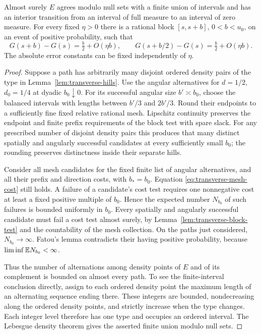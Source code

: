 \begin{lemma}
\label{lem:transverse-finite-jumps}
Almost surely $E$ agrees modulo null sets with a finite union of
intervals and has an interior transition from an interval of full
measure to an interval of zero measure.  For every fixed $\eta>0$
there is a rational block $[s,s+b]$, $0<b<u_0$, on an event of
positive probability, such that
\begin{equation}\label{eq:transverse-jump-block}
 G(s+b)-G(s)=\tfrac b2+O(\eta b),\qquad
 G(s+b/2)-G(s)=\tfrac b2+O(\eta b).
\end{equation}
The absolute error constants can be fixed independently of $\eta$.
\end{lemma}

\begin{proof}
Suppose a path has arbitrarily many disjoint ordered density pairs
of the type in Lemma~\ref{lem:transverse-hills}.  Use the angular
alternatives for $d=1/2$, $d_0=1/4$ at dyadic $b_0\downarrow0$.
For its successful angular size $b'\asymp b_0$, choose the balanced
intervals with lengths between $b'/3$ and $2b'/3$.  Round their
endpoints to a sufficiently fine fixed relative rational mesh.
Lipschitz continuity preserves the endpoint and finite prefix
requirements of the block test with spare slack.  For any prescribed
number of disjoint density pairs this produces that many distinct
spatially and angularly successful candidates at every sufficiently
small $b_0$; the rounding preserves distinctness inside their
separate hills.

Consider all mesh candidates for the fixed finite list of angular
alternatives, and all their prefix and direction costs, with
$b_*=b_0$.  Equation \eqref{eq:transverse-mesh-cost} still holds.
A failure of a candidate's cost test requires one nonnegative cost
at least a fixed positive multiple of $b_0$.  Hence the expected
number $N_{b_0}$ of such failures is bounded uniformly in $b_0$.
Every spatially and angularly successful candidate must fail a cost
test almost surely, by Lemma~\ref{lem:transverse-block-test} and
the countability of the mesh collection.  On the paths just
considered, $N_{b_0}\to\infty$.  Fatou's lemma contradicts their
having positive probability, because $\liminf\mathbb E N_{b_0}<\infty$.

Thus the number of alternations among density points of $E$ and
of its complement is bounded on almost every path.  To see the
finite-interval conclusion directly, assign to each ordered density
point the maximum length of an alternating sequence ending there.
These integers are bounded, nondecreasing along the ordered density
points, and strictly increase when the type changes.  Each integer
level therefore has one type and occupies an ordered interval.
The Lebesgue density theorem gives the asserted finite union modulo
null sets.


\end{proof}
